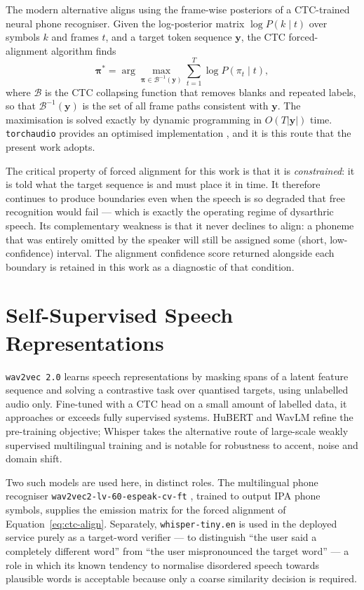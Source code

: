 The modern alternative aligns using the frame-wise posteriors of a CTC-trained
neural phone recogniser. Given the log-posterior matrix
$\log P(k \mid t)$ over symbols $k$ and frames $t$, and a target token sequence
$\mathbf{y}$, the CTC forced-alignment algorithm finds
\begin{equation}
\boldsymbol{\pi}^{*} = \arg\max_{\boldsymbol{\pi} \in \mathcal{B}^{-1}(\mathbf{y})}
\sum_{t=1}^{T} \log P(\pi_t \mid t),
\label{eq:ctc-align}
\end{equation}
where $\mathcal{B}$ is the CTC collapsing function that removes blanks and
repeated labels, so that $\mathcal{B}^{-1}(\mathbf{y})$ is the set of all frame
paths consistent with $\mathbf{y}$. The maximisation is solved exactly by
dynamic programming in $O(T|\mathbf{y}|)$ time. \texttt{torchaudio} provides an
optimised implementation \cite{yang2022torchaudio}, and it is this route that
the present work adopts.

The critical property of forced alignment for this work is that it is
\emph{constrained}: it is told what the target sequence is and must place it in
time. It therefore continues to produce boundaries even when the speech is so
degraded that free recognition would fail --- which is exactly the operating
regime of dysarthric speech. Its complementary weakness is that it never
declines to align: a phoneme that was entirely omitted by the speaker will
still be assigned some (short, low-confidence) interval. The alignment
confidence score returned alongside each boundary is retained in this work as
a diagnostic of that condition.

\section{Self-Supervised Speech Representations}
\label{sec:lit-ssl}

\texttt{wav2vec\,2.0} \cite{baevski2020wav2vec} learns speech representations by
masking spans of a latent feature sequence and solving a contrastive task over
quantised targets, using unlabelled audio only. Fine-tuned with a CTC head on a
small amount of labelled data, it approaches or exceeds fully supervised
systems. HuBERT \cite{hsu2021hubert} and WavLM \cite{chen2022wavlm} refine the
pre-training objective; Whisper \cite{radford2023robust} takes the alternative
route of large-scale weakly supervised multilingual training and is notable for
robustness to accent, noise and domain shift.

Two such models are used here, in distinct roles. The multilingual phone
recogniser \texttt{wav2vec2-lv-60-espeak-cv-ft} \cite{xu2022simple}, trained to
output IPA phone symbols, supplies the emission matrix for the forced alignment
of Equation~\eqref{eq:ctc-align}. Separately, \texttt{whisper-tiny.en} is used
in the deployed service purely as a target-word verifier --- to distinguish
``the user said a completely different word'' from ``the user mispronounced the
target word'' --- a role in which its known tendency to normalise disordered
speech towards plausible words is acceptable because only a coarse similarity
decision is required.

